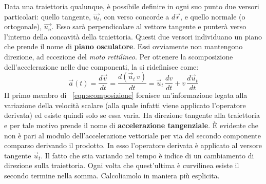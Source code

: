 \documentclass[10pt,a4paper]{book}
\begin{document}
Data una traiettoria qualunque, è possibile definire in ogni suo punto due versori particolari: quello tangente, $\vec{u_t}$, con verso concorde a $d\vec{r}$, e quello normale (o ortogonale), $\vec{u_n}$. Esso sarà perpendicolare al vettore tangente e punterà verso l'interno della concavità della traiettoria. Questi due versori individuano un piano che prende il nome di \textbf{piano osculatore}. Essi ovviamente non mantengono direzione, ad eccezione del \emph{moto rettilineo}.
Per ottenere la scomposizione dell'accelerazione nelle due componenti, la si ridefinisce come:
\begin{equation}
	\label{eqn:scomposizione}
	\boxed{\vec{a}(t)=\frac{d\vec{v}}{dt}=\frac{d(\vec{u}_t\,v)}{dt}=\vec{u}_t\,\frac{dv}{dt}+v\,\frac{d\vec{u}_t}{dt}}
\end{equation}
II primo membro di ~\eqref{eqn:scomposizione} fornisce un'informazione legata alla variazione della velocità scalare (alla quale infatti viene applicato l'operatore derivata) ed esiste quindi solo se essa varia. Ha direzione tangente alla traiettoria e per tale motivo prende il nome di \textbf{accelerazione tangenziale}. È evidente che non è pari al modulo dell'accelerazione vettoriale per via del secondo componente comparso derivando il prodotto. In esso l'operatore derivata è applicato al versore tangente $\vec{u}_t$. Il fatto che stia variando nel tempo è indice di un cambiamento di direzione sulla traiettoria. Ogni volta che quest'ultima è curvilinea esiste il secondo termine nella somma. Calcoliamolo in maniera più esplicita.
\end{document}
